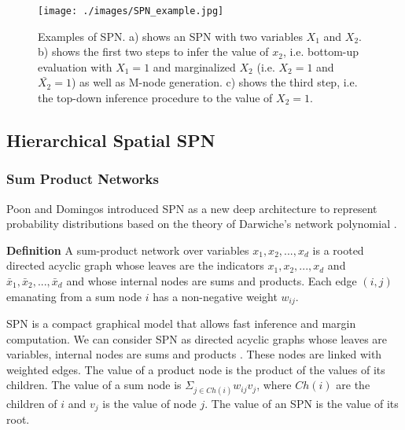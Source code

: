 \documentclass[journal]{IEEEtran}
\begin{document}
\begin{figure*}[htb]
	\begin{center}
		\texttt{[image: ./images/SPN\_example.jpg]}
	\end{center}
	\caption{Examples of SPN. a) shows an SPN with two variables $ X_1 $ and $ X_2 $. b) shows the first two steps to infer the value of $ x_2 $, i.e. bottom-up evaluation with $ X_1=1 $ and marginalized $ X_2 $ (i.e. $ X_2=1 $ and $ \bar{X_2}=1 $) as well as M-node generation. c) shows the third step, i.e. the top-down inference procedure to the value of $ X_2=1 $. }
	\label{fig:SPNExample}
\end{figure*}




\subsection{Hierarchical Spatial SPN}

\subsubsection{Sum Product Networks}

Poon and Domingos \cite{poon2011SPNIntroduce} introduced SPN as a new deep architecture to represent probability distributions  based on the theory of Darwiche's network polynomial \cite{Darwiche:2003:DAI:765568.765570}.

\textbf{Definition} \cite{poon2011SPNIntroduce} A sum-product network over variables $ x_1,x_2,...,x_d $ is a rooted directed acyclic graph whose leaves are the indicators $ x_1,x_2,...,x_d $ and $ \bar{x}_1,\bar{x}_2,...,\bar{x}_d $ and whose internal nodes are sums and products. Each edge $ (i,j) $ emanating from a sum node $ i $ has a non-negative weight $ w_{ij} $.




SPN is a compact graphical model that allows fast inference and margin computation. We can consider SPN as directed acyclic graphs whose leaves are variables, internal nodes are sums and products \cite{poon2011SPNIntroduce}. These nodes are linked with weighted edges.
The value of a product node is the product of the values of its children. The value of a sum node is $ \Sigma_{j\in Ch(i)}w_{ij}v_j $, where $ Ch(i) $ are the children of $ i $ and $ v_j $ is the value of node $ j $. The value of an SPN is the value of its root.
\end{document}
